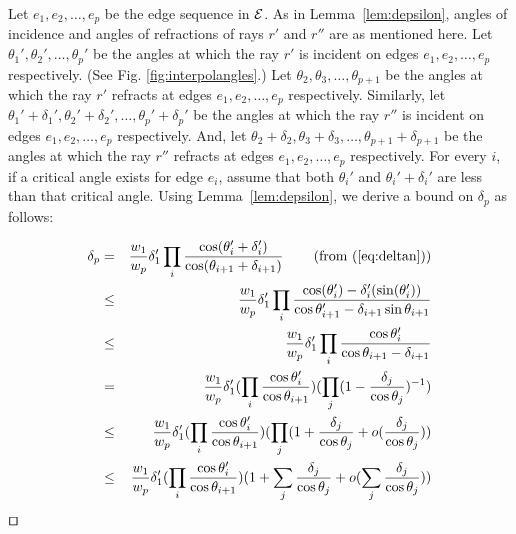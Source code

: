 \documentclass[11pt]{article}
\def\qed{\hbox{\rlap{$\sqcap$}$\sqcup$}}
\newenvironment{proof}{\par\noindent{\bf Proof:}}{\mbox{}\hfill$\qed$\\}
\begin{document}
\begin{proof}
Let $e_1, e_2, \ldots, e_p$ be the edge sequence in $\cal{E}$.
As in Lemma~\ref{lem:depsilon}, angles of incidence and angles of refractions of rays $r'$ and $r''$ are as mentioned here.
Let $\theta_1', \theta_2', \ldots, \theta_{p}'$ be the angles at which the ray $r'$ is incident on edges $e_1, e_2, \ldots, e_{p}$ respectively.
(See Fig. \ref{fig:interpolangles}.)
Let $\theta_2, \theta_3, \ldots, \theta_{p+1}$ be the angles at which the ray $r'$ refracts at edges $e_1, e_2, \ldots, e_{p}$ respectively.
Similarly, let $\theta_1'+\delta_1', \theta_2'+\delta_2', \ldots, \theta_{p}'+\delta_{p}'$ be the angles at which the ray $r''$ is incident on edges $e_1, e_2, \ldots, e_{p}$ respectively.
And, let $\theta_2+\delta_2, \theta_3+\delta_3, \ldots, \theta_{p+1}+\delta_{p+1}$ be the angles at which the ray $r''$ refracts at edges $e_1, e_2, \ldots, e_{p}$ respectively.
For every $i$, if a critical angle exists for edge $e_i$, assume that both $\theta_i'$ and $\theta_i' + \delta_i'$ are less than that critical angle.
Using Lemma~\ref{lem:depsilon}, we derive a bound on $\delta_p$ as follows: 

\begin{eqnarray*}
\delta_p &=& \frac{w_1}{w_p} \delta_1' \prod_i
\frac{\cos(\theta_i'+\delta_i')}{\cos(\theta_{i+1}+\delta_{i+1})} \hspace{0.3in} \text{(from (\ref{eq:deltan}))}\\
&\le& \frac{w_1}{w_p} \delta_1' \prod_i
\frac{\cos(\theta_i')-\delta_i'(\sin(\theta_i'))}{\cos\theta_{i+1}'-\delta_{i+1}\sin\theta_{i+1}}\\
&\le& \frac{w_1}{w_p} \delta_1' \prod_i
\frac{\cos{\theta_i'}}{\cos{\theta_{i+1}}-\delta_{i+1}} \\
&= &\frac{w_1}{w_p} \delta_1' (\prod_i \frac{\cos\theta_i'}{\cos\theta_{i+1}})
(\prod_j(1-\frac{\delta_j}{\cos{\theta_j}})^{-1})\\
&\le &\frac{w_1}{w_p} \delta_1' (\prod_i
\frac{\cos\theta_i'}{\cos\theta_{i+1}}) (\prod_j
(1+\frac{\delta_j}{\cos\theta_j}+ o(\frac{\delta_j}{\cos\theta_j}))\\
&\le& \frac{w_1}{w_p} \delta_1' (\prod_i
\frac{\cos\theta_i'}{\cos\theta_{i+1}})
(1+\sum_j\frac{\delta_j}{\cos\theta_j} +
o(\sum_j \frac{\delta_j}{\cos\theta_j}))\\
\end{eqnarray*}


\end{proof}
\end{document}
